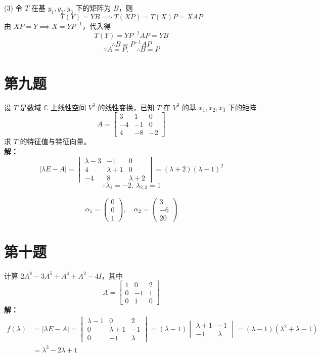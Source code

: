 \documentclass{article}
\begin{document}
(3) 令 \( T \) 在基 \( y_1,y_2,y_3 \) 下的矩阵为 \( B \)，则
\[
T(Y) = YB \implies T(XP) = T(X)P = XAP
\]
由 \( XP = Y \implies X = YP^{-1} \)，代入得
\[
T(Y) = YP^{-1}AP = YB
\]
\[
\therefore B = P^{-1}AP
\]
\[
\because A = P, \quad \therefore B = P
\]

\newpage
\section{第九题}\noindent
设 $T$ 是数域 $\mathbb{C}$ 上线性空间 $V^3$ 的线性变换，已知 $T$ 在 $V^3$ 的基 $x_1,x_2,x_3$ 下的矩阵
\[
A = \begin{bmatrix}
3 & 1 & 0 \\
-4 & -1 & 0 \\
4 & -8 & -2
\end{bmatrix}
\]
求 $T$ 的特征值与特征向量。 \\
\textbf{解：}
\[
|\lambda E - A| = 
\begin{vmatrix}
\lambda - 3 & -1 & 0 \\
4 & \lambda + 1 & 0 \\
-4 & 8 & \lambda + 2
\end{vmatrix}
= (\lambda + 2)(\lambda - 1)^2
\]
\[
\therefore \lambda_1 = -2,\ \lambda_{2,3} = 1
\]

\[
\alpha_1 = \begin{pmatrix} 0 \\ 0 \\ 1 \end{pmatrix},\quad 
\alpha_2 = \begin{pmatrix} 3 \\ -6 \\ 20 \end{pmatrix}
\]

\newpage
\section{第十题}\noindent
计算 $2A^8-3A^5+A^4+A^2-4I$，其中
\[
A = \begin{bmatrix}
1 & 0 & 2 \\
0 & -1 & 1 \\
0 & 1 & 0
\end{bmatrix}
\]
\textbf{解：}
\[
\begin{aligned}
f(\lambda) &= |\lambda E - A| = 
\begin{vmatrix}
\lambda - 1 & 0 & 2 \\
0 & \lambda + 1 & -1 \\
0 & -1 & \lambda
\end{vmatrix} 
= (\lambda - 1) \begin{vmatrix}
\lambda + 1 & -1 \\
-1 & \lambda
\end{vmatrix} 
= (\lambda - 1)(\lambda^2 + \lambda - 1) \\
&= \lambda^3 - 2\lambda + 1
\end{aligned}
\]
\end{document}

